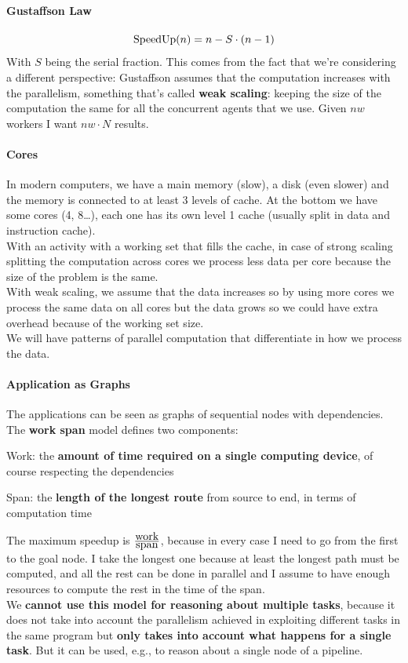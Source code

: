 \documentclass[10pt]{report}
\begin{document}
\paragraph{Gustaffson Law} $$\hbox{SpeedUp}(n) = n - S\cdot(n-1)$$ With $S$ being the serial fraction. This comes from the fact that we're considering a different perspective: Gustaffson assumes that the computation increases with the parallelism, something that's called \textbf{weak scaling}: keeping the size of the computation the same for all the concurrent agents that we use. Given $nw$ workers I want $nw\cdot N$ results.

\paragraph{Cores} In modern computers, we have a main memory (slow), a disk (even slower) and the memory is connected to at least 3 levels of cache. At the bottom we have some cores (4, 8\ldots), each one has its own level 1 cache (usually split in data and instruction cache).\\
With an activity with a working set that fills the cache, in case of strong scaling splitting the computation across cores we process less data per core because the size of the problem is the same.\\
With weak scaling, we assume that the data increases so by using more cores we process the same data on all cores but the data grows so we could have extra overhead because of the working set size.\\
We will have patterns of parallel computation that differentiate in how we process the data.
\paragraph{Application as Graphs} The applications can be seen as graphs of sequential nodes with dependencies. The \textbf{work span} model defines two components:
\begin{list}{}{}
	\item Work: the \textbf{amount of time required on a single computing device}, of course respecting the dependencies
	\item Span: the \textbf{length of the longest route} from source to end, in terms of computation time
\end{list}
The maximum speedup is $\frac{\hbox{work}}{\hbox{span}}$, because in every case I need to go from the first to the goal node. I take the longest one because at least the longest path must be computed, and all the rest can be done in parallel and I assume to have enough resources to compute the rest in the time of the span.\\
We \textbf{cannot use this model for reasoning about multiple tasks}, because it does not take into account the parallelism achieved in exploiting different tasks in the same program but \textbf{only takes into account what happens for a single task}. But it can be used, e.g., to reason about a single node of a pipeline.
\end{document}
